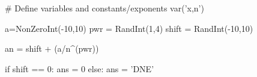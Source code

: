 





%
%
%
%
%
%
%
%
%
%
%
%
%
%
%
%
%



\begin{sagesilent}
# Define variables and constants/exponents
var('x,n')


a=NonZeroInt(-10,10)
pwr = RandInt(1,4)
shift = RandInt(-10,10)

an = shift + (a/n^(pwr))

if shift == 0:
   ans = 0
else:
   ans = 'DNE'

\end{sagesilent}

